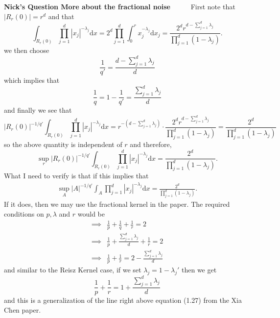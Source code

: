 \documentclass[a4paper,11pt]{article}
\numberwithin{equation}{section}
\theoremstyle{plain}
\theoremstyle{definition}
\newcommand{\ud}{\ensuremath{\mathrm{d} }}
\newcounter{NQ}
\newenvironment{NickQuestion}[1][] %
{\refstepcounter{NQ}
	\begin{mdframed}[backgroundcolor=lightgray]\textbf{Nick's Question \theNQ \: #1~~}~~~\noindent}%
	{\end{mdframed}}
\numberwithin{NQ}{section}
\numberwithin{LQ}{section}
\numberwithin{ZQ}{section}
\begin{document}
\begin{NickQuestion}[More about the fractional noise]
		First note that $|R_r(0)| = r^d$ and that
		\[
		\int_{R_r(0)} \prod_{j = 1}^d |x_j|^{-\lambda_j} \ud x = 2^d \prod_{j = 1}^d \int_{0}^r x_j^{-\lambda_j} \ud x_j = \frac{2^d r ^{d-\sum_{j=1}^d \lambda_j}}{\prod_{j = 1}^d (1-\lambda_j)}.
		\]
		we then choose
		\[
		\frac{1}{q'} = \frac{d-\sum_{j=1}^d \lambda_j}{d}
		\]
		which implies that
		\[
		\frac{1}{q} = 1- \frac{1}{q'} = \frac{\sum_{j=1}^d \lambda_j}{d}
		\]
		and finally we see that
		\[
		|R_r(0)|^{-1/q'} \int_{R_r(0)} \prod_{j = 1}^d |x_j|^{-\lambda_j} \ud x = r^{-(d-\sum_{j=1}^d \lambda_j)} \cdot  \frac{2^d r ^{d-\sum_{j=1}^d \lambda_j}}{\prod_{j = 1}^d (1-\lambda_j)} =  \frac{2^d }{\prod_{j = 1}^d (1-\lambda_j)}
		\]
		so the above quantity is independent of $r$ and therefore,
		\[
		\sup_r |R_r(0)|^{-1/q'} \int_{R_r(0)} \prod_{j = 1}^d |x_j|^{-\lambda_j} \ud x =  \frac{2^d }{\prod_{j = 1}^d (1-\lambda_j)}.
		\]
		What I need to verify is that if this implies that
		\begin{align}\label{frackernelyoung}
		\sup_A |A|^{-1/q'} \int_{A} \prod_{j = 1}^d |x_j|^{-\lambda_j} \ud x =  \frac{2^d }{\prod_{j = 1}^d (1-\lambda_j)}.
		\end{align}
		If it does, then we may use the fractional kernel in the paper. The required conditions on $p,\lambda$ and $r$ would be
		\begin{align*}
		\implies &	\frac{1}{p} + \frac{1}{q} + \frac{1}{r} = 2
		\\ \implies & \frac{1}{p} + \frac{ \sum_{j=1}^d \lambda_j }{d} + \frac{1}{r} = 2
		\\ \implies & \frac{1}{p}  + \frac{1}{r} = 2 - \frac{ \sum_{j=1}^d \lambda_j }{d}
		\end{align*}
		and similar to the Reisz Kernel case, if we set $ \lambda_j = 1- \lambda_j'$ then we get
		\[
		\frac{1}{p}  + \frac{1}{r} = 1 + \frac{ \sum_{j=1}^d \lambda_j }{d}
		\]
		and this is a generalization of the line right above equation (1.27) from the Xia Chen paper.
	\end{NickQuestion}
\end{document}
